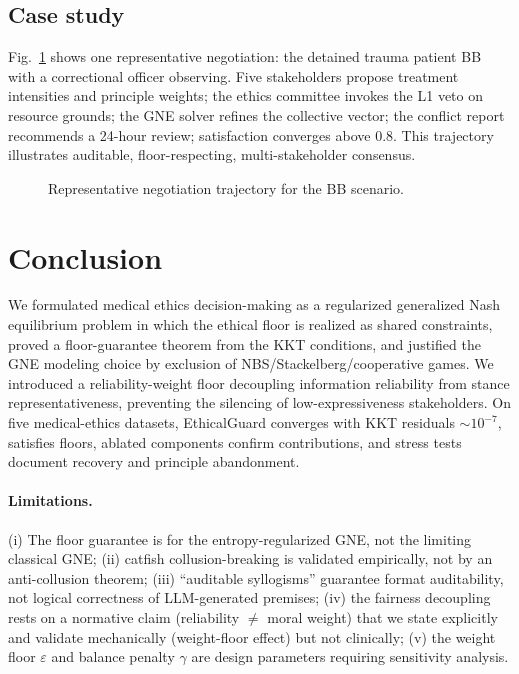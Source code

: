 \documentclass[11pt]{article}
\begin{document}
\subsection{Case study}
Fig.~\ref{fig:case} shows one representative negotiation: the detained trauma
patient BB with a correctional officer observing. Five stakeholders propose
treatment intensities and principle weights; the ethics committee invokes the
L1 veto on resource grounds; the GNE solver refines the collective vector;
the conflict report recommends a 24-hour review; satisfaction converges above
0.8. This trajectory illustrates auditable, floor-respecting,
multi-stakeholder consensus.
\begin{figure}[t]
  \centering
  \caption{Representative negotiation trajectory for the BB scenario.}
  \label{fig:case}
\end{figure}

\section{Conclusion}
We formulated medical ethics decision-making as a regularized generalized
Nash equilibrium problem in which the ethical floor is realized as shared
constraints, proved a floor-guarantee theorem from the KKT conditions, and
justified the GNE modeling choice by exclusion of NBS/Stackelberg/cooperative
games. We introduced a reliability-weight floor decoupling information
reliability from stance representativeness, preventing the silencing of
low-expressiveness stakeholders. On five medical-ethics datasets, EthicalGuard
converges with KKT residuals $\sim10^{-7}$, satisfies floors, ablated
components confirm contributions, and stress tests document recovery and
principle abandonment.
\paragraph{Limitations.}
(i) The floor guarantee is for the entropy-regularized GNE, not the limiting
classical GNE; (ii) catfish collusion-breaking is validated empirically, not
by an anti-collusion theorem; (iii) ``auditable syllogisms'' guarantee format
auditability, not logical correctness of LLM-generated premises; (iv) the
fairness decoupling rests on a normative claim (reliability $\neq$ moral
weight) that we state explicitly and validate mechanically (weight-floor
effect) but not clinically; (v) the weight floor $\varepsilon$ and balance
penalty $\gamma$ are design parameters requiring sensitivity analysis.
\end{document}

